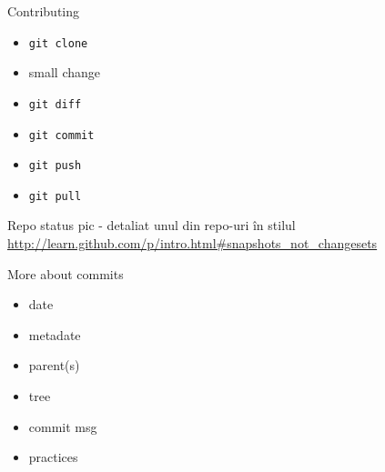 \documentclass{beamer}
\begin{document}
\begin{frame}{Contributing}
  \begin{itemize}
    \item \texttt{git clone}
    \item small change
    \item \texttt{git diff}
    \item \texttt{git commit}
    \item \texttt{git push}
    \item \texttt{git pull}
  \end{itemize}
\end{frame}

\begin{frame}{Repo status}
pic - detaliat unul din repo-uri în stilul
\url{http://learn.github.com/p/intro.html\#snapshots\_not\_changesets}
\end{frame}

\begin{frame}{More about commits}
  \begin{itemize}
    \item date
    \item metadate
    \item parent(s)
    \item tree
    \item commit msg
    \item practices
  \end{itemize}
\end{frame}
\end{document}
